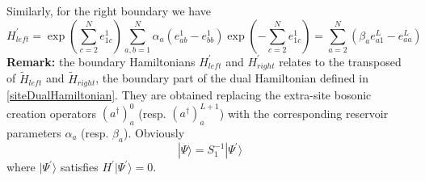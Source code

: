 \documentclass[11pt]{article}
\numberwithin{equation}{section}
\numberwithin{equation}{subsection}
\begin{document}
Similarly, for the right boundary we have 
\begin{equation}
H_{left}^{'}=\exp{\left(\sum_{c=2}^{N}e_{1c}^{1}\right)}\sum_{a,b=1}^{N}\alpha_{a}\left(e_{ab}^{1}-e_{bb}^{1}\right)\exp{\left(-\sum_{c=2}^{N}e_{1c}^{1}\right)}=\sum_{a=2}^{N}\left(\beta_{a}e_{a1}^{L}-e_{aa}^{L}\right)
\end{equation}
\textbf{Remark:} the boundary Hamiltonians $H_{left}^{'}$ and $H_{right}^{'}$ relates to the transposed of  $\widetilde{H}_{left}$ and $\widetilde{H}_{right}$, the boundary part of the dual Hamiltonian  defined in \eqref{siteDualHamiltonian}. They are obtained replacing the  extra-site bosonic creation operators $(a^{\dagger})_{a}^{0}$  (resp. $(a^{\dagger})_{a}^{L+1}$) with the corresponding reservoir parameters $\alpha_a$ (resp. $\beta_a$).
\newline\newline
Obviously
\begin{equation}\label{S1-Inverse}
	|\Psi\rangle =S_{1}^{-1}|\Psi^{'}\rangle
\end{equation}
where $|\Psi^{'}\rangle$ satisfies $H^{'}|\Psi^{'}\rangle=0$.
\end{document}
